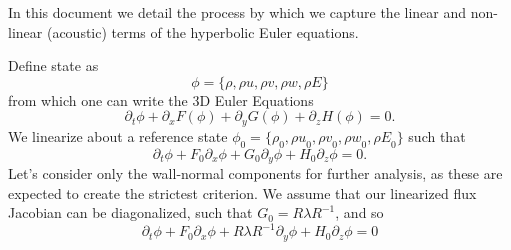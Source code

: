 \documentclass[letterpaper,11pt,nointlimits,reqno]{amsart}
\begin{document}
In this document we detail the process by which we capture the linear
and non-linear (acoustic) terms of the hyperbolic Euler equations.

Define state as
\begin{equation}
 \phi = \{\rho, \rho u, \rho v, \rho w, \rho E \}
\end{equation}
from which one can write the 3D Euler Equations
\begin{equation}
 \partial_t \phi + \partial_x F(\phi) + \partial_y G(\phi) + \partial_z
  H(\phi) = 0
  .
\end{equation}
We linearize about a reference state $\phi_0 = \{\rho_0, {\rho u}_0,
{\rho v}_0, {\rho w}_0, {\rho E}_0 \}$ such that
\begin{equation}
 \partial_t \phi +  F_0 \partial_x \phi + G_0 \partial_y \phi + H_0 \partial_z
  \phi = 0
  .
\end{equation}
Let's consider only the wall-normal components for further analysis, as
these are expected to create the strictest criterion.  We assume that our
linearized flux Jacobian can be diagonalized, such that $G_0 = R \lambda
R^{-1}$, and so
\begin{equation}
 \partial_t \phi +  F_0 \partial_x \phi + R \lambda R^{-1} \partial_y \phi + H_0 \partial_z
  \phi = 0
\end{equation}
\end{document}
